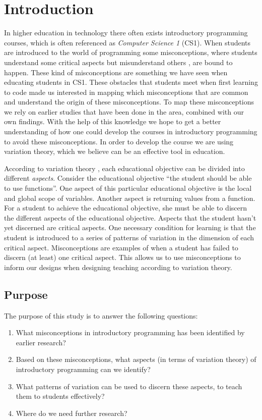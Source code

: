 \mode*
\section{Introduction}


In higher education in technology there often exists introductory 
programming courses, which is often referenced as \emph{Computer Science 1} 
(CS1). When students are introduced to the world of programming some
misconceptions, where students understand some critical aspects but 
misunderstand others \parencite{NCOL}, are bound to happen. These kind of 
misconceptions are something we have seen when educating students in CS1. 
These obstacles that students meet when first learning to code made us 
interested in mapping which misconceptions that are common and understand 
the origin of these misconceptions. To map these misconceptions we rely on 
earlier studies that have been done in the area, combined with our own 
findings. With the help of this knowledge we hope to get a better 
understanding of how one  could develop the courses in introductory 
programming to avoid these  misconceptions. In order to develop the course 
we are using variation theory, which we believe can be an effective tool in 
education. 

According to variation theory \parencite[Ch.~2]{NCOL}, each educational 
objective can be divided into different \emph{aspects}.
Consider the educational objective \enquote{the student should be able to 
use 
functions}.
One aspect of this particular educational objective is the local and global 
scope 
of variables.
Another aspect is returning values from a function.
For a student to achieve the educational objective, she must be able to 
discern 
the different aspects of the educational objective.
Aspects that the student hasn't yet discerned are critical aspects.
One necessary condition for learning is that the student is introduced to a 
series of patterns of variation in the dimension of each critical aspect.
Misconceptions are examples of when a student has failed to discern (at 
least) 
one critical aspect.
This allows us to use misconceptions to inform our designs when designing 
teaching according to variation theory.

\subsection{Purpose}

The purpose of this study is to answer the following questions:
\begin{enumerate}
  \item What misconceptions in introductory programming has been identified 
by 
    earlier research?
  \item Based on these misconceptions, what aspects (in terms of variation 
    theory) of introductory programming can we identify?
  \item What patterns of variation can be used to discern these aspects, to 
    teach them to students effectively?
  \item Where do we need further research?
\end{enumerate}
